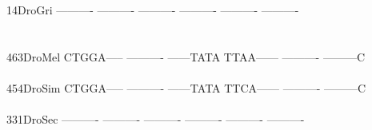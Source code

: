 \documentclass[11pt,twoside,reqno,a4paper]{article}
\begin{document}
{14\hspace*{3\charwidth}DroGri	----------	----------	----------	----------	----------	----------	\\
\hspace*{5\charwidth}\hspace*{7\charwidth}\hspace*{1\charwidth}\hspace*{1\charwidth}\hspace*{1\charwidth}\hspace*{1\charwidth}\hspace*{1\charwidth}\hspace*{1\charwidth}\\
\\
463\hspace*{2\charwidth}DroMel	CTGGA-----	----------	------TATA	TTAA------	----------	---------C	\\
\hspace*{5\charwidth}\hspace*{7\charwidth}\hspace*{1\charwidth}\hspace*{1\charwidth}\hspace*{1\charwidth}\hspace*{1\charwidth}\hspace*{1\charwidth}\hspace*{1\charwidth}\\
454\hspace*{2\charwidth}DroSim	CTGGA-----	----------	------TATA	TTCA------	----------	---------C	\\
\hspace*{5\charwidth}\hspace*{7\charwidth}\hspace*{1\charwidth}\hspace*{1\charwidth}\hspace*{1\charwidth}\hspace*{1\charwidth}\hspace*{1\charwidth}\hspace*{1\charwidth}\\
331\hspace*{2\charwidth}DroSec	----------	----------	----------	----------	----------	----------	\\
\hspace*{5\charwidth}\hspace*{7\charwidth}\hspace*{1\charwidth}\hspace*{1\charwidth}\hspace*{1\charwidth}\hspace*{1\charwidth}\hspace*{1\charwidth}\hspace*{1\charwidth}\\
}
\end{document}
